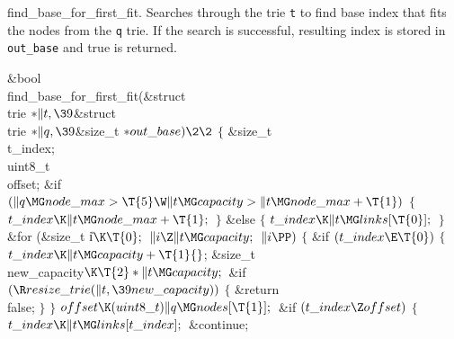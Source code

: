 find\_base\_for\_first\_fit.
Searches through the trie {\tt t} to find base index that fits the nodes from
the {\tt q} trie. If the search is
successful, resulting index is stored in {\tt out\_base} and true is returned.

\Y\B\1\1\&{bool} \\{find\_base\_for\_first\_fit}(\&{struct} \\{trie} ${}{*}\|t,%
\39{}$\&{struct} \\{trie} ${}{*}\|q,\39{}$\&{size\_t} ${}{*}\\{out\_base})\2%
\2{}$\6
${}\{{}$\1\6
\&{size\_t} \\{t\_index};\7
\\{uint8\_t}\\{offset};\6
\&{if} ${}(\|q\MG\\{node\_max}>\T{5}\W\|t\MG\\{capacity}>\|t\MG\\{node\_max}+%
\T{1}){}$\5
${}\{{}$\1\6
${}\\{t\_index}\K\|t\MG\\{node\_max}+\T{1};{}$\6
\4${}\}{}$\2\6
\&{else}\5
${}\{{}$\1\6
${}\\{t\_index}\K\|t\MG\\{links}[\T{0}];{}$\6
\4${}\}{}$\2\6
\&{for} (\&{size\_t} \|i${}\K\T{0};{}$ ${}\|i\Z\|t\MG\\{capacity};{}$ ${}\|i%
\PP){}$\5
${}\{{}$\1\6
\&{if} ${}(\\{t\_index}\E\T{0}){}$\5
${}\{{}$\1\6
${}\\{t\_index}\K\|t\MG\\{capacity}+\T{1}{}$;%
\7
\&{size\_t} \\{new\_capacity}${}\K\T{2}*\|t\MG\\{capacity};{}$\7
\&{if} ${}(\R\\{resize\_trie}(\|t,\39\\{new\_capacity})){}$\5
${}\{{}$\1\6
\&{return} \\{false};\6
\4${}\}{}$\2\6
\4${}\}{}$\2\6
${}\\{offset}\K(\\{uint8\_t})\|q\MG\\{nodes}[\T{1}];{}$\6
\&{if} ${}(\\{t\_index}\Z\\{offset}){}$\5
${}\{{}$\1\6
${}\\{t\_index}\K\|t\MG\\{links}[\\{t\_index}];{}$\6
\&{continue};\6
